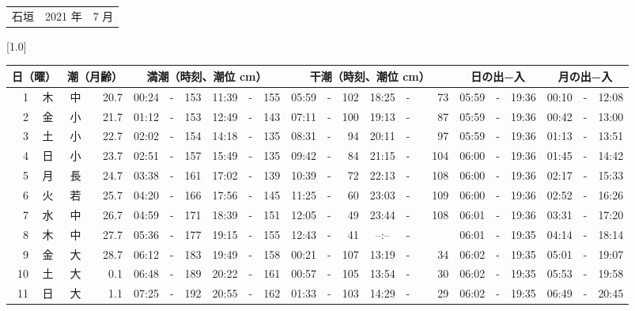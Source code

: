 \documentclass[12pt,a4j]{jsarticle}
\begin{document}
 \begin{table}[htbp]
 \begin{center}
 \begin{tabular}{lcc}
 \LARGE{石垣}  & \large{2021 年} & \large{ 7 月} \\
 \end{tabular}
 \end{center}
 \begin{center}
    \scalebox{0.7}[1.0]{
    \begin{tabular}{|rc|cr|ccrccr|ccrccr|ccc|ccc|}
    \hline
    \multicolumn{2}{|c|}{日（曜）} & \multicolumn{2}{c|}{潮（月齢）} & \multicolumn{6}{c|}{満潮（時刻、潮位 cm）} & \multicolumn{6}{c|}{干潮（時刻、潮位 cm）} & \multicolumn{3}{c|}{日の出−入} &  \multicolumn{3}{c|}{月の出−入}\\
 \hline
 1 & 木 & 中 & 20.7 &  00:24 &-& 153 &  11:39 &-& 155 &  05:59 &-& 102 &  18:25 &-&  73 & 05:59 & -& 19:36 & 00:10 & -& 12:08 \\
 2 & 金 & 小 & 21.7 &  01:12 &-& 153 &  12:49 &-& 143 &  07:11 &-& 100 &  19:13 &-&  87 & 05:59 & -& 19:36 & 00:42 & -& 13:00 \\
 3 & 土 & 小 & 22.7 &  02:02 &-& 154 &  14:18 &-& 135 &  08:31 &-&  94 &  20:11 &-&  97 & 05:59 & -& 19:36 & 01:13 & -& 13:51 \\
 4 & 日 & 小 & 23.7 &  02:51 &-& 157 &  15:49 &-& 135 &  09:42 &-&  84 &  21:15 &-& 104 & 06:00 & -& 19:36 & 01:45 & -& 14:42 \\
 5 & 月 & 長 & 24.7 &  03:38 &-& 161 &  17:02 &-& 139 &  10:39 &-&  72 &  22:13 &-& 108 & 06:00 & -& 19:36 & 02:17 & -& 15:33 \\
 6 & 火 & 若 & 25.7 &  04:20 &-& 166 &  17:56 &-& 145 &  11:25 &-&  60 &  23:03 &-& 109 & 06:00 & -& 19:36 & 02:52 & -& 16:26 \\
 7 & 水 & 中 & 26.7 &  04:59 &-& 171 &  18:39 &-& 151 &  12:05 &-&  49 &  23:44 &-& 108 & 06:01 & -& 19:36 & 03:31 & -& 17:20 \\
 8 & 木 & 中 & 27.7 &  05:36 &-& 177 &  19:15 &-& 155 &  12:43 &-&  41 &  --:-- &-&~~~~~ & 06:01 & -& 19:35 & 04:14 & -& 18:14 \\
 9 & 金 & 大 & 28.7 &  06:12 &-& 183 &  19:49 &-& 158 &  00:21 &-& 107 &  13:19 &-&  34 & 06:02 & -& 19:35 & 05:01 & -& 19:07 \\
10 & 土 & 大 &  0.1 &  06:48 &-& 189 &  20:22 &-& 161 &  00:57 &-& 105 &  13:54 &-&  30 & 06:02 & -& 19:35 & 05:53 & -& 19:58 \\
11 & 日 & 大 &  1.1 &  07:25 &-& 192 &  20:55 &-& 162 &  01:33 &-& 103 &  14:29 &-&  29 & 06:02 & -& 19:35 & 06:49 & -& 20:45 \\

\end{tabular}}
\end{center}
\end{table}
\end{document}
